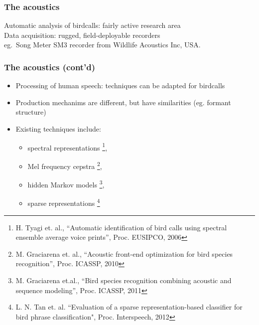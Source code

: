 \documentclass[mathserif]{beamer}
\begin{document}
\begin{frame}
\frametitle{The acoustics}
\vspace{-1cm}
Automatic analysis of birdcalls: fairly active research area\\
\vspace{0.3cm}
\pause
Data acquisition: rugged, field-deployable recorders \\
eg.~Song Meter SM3 recorder from Wildlife Acoustics Inc, USA.
\begin{figure}
	\centering
\end{figure}
\end{frame}


\begin{frame}
\frametitle{The acoustics (cont'd)}
\begin{itemize}
\item<2-> Processing of human speech: techniques can be adapted for birdcalls
\item<3-> Production mechanims are different, but have similarities (eg. formant
structure)
\item<4-> Existing techniques include:
\begin{itemize}
	\item spectral representations \footnote{
	H. Tyagi et. al., ``Automatic identification of bird calls using spectral 
	ensemble average voice prints'', Proc. EUSIPCO, 2006},
	\item Mel frequency cepstra \footnote{M. Graciarena et. al., 
	``Acoustic front-end optimization for bird species recognition'', 
	Proc. ICASSP, 2010}, 
	\item hidden Markov models \footnote{M. Graciarena et.al., 
	``Bird species recognition combining acoustic and sequence modeling'', 
	Proc. ICASSP, 2011}, 
	\item sparse representations \footnote{L. N. Tan et. al. 
	``Evaluation of a sparse representation-based classifier for bird phrase 
	classification", Proc. Interspeech, 2012}
\end{itemize}
\end{itemize}
\end{frame}
\end{document}
